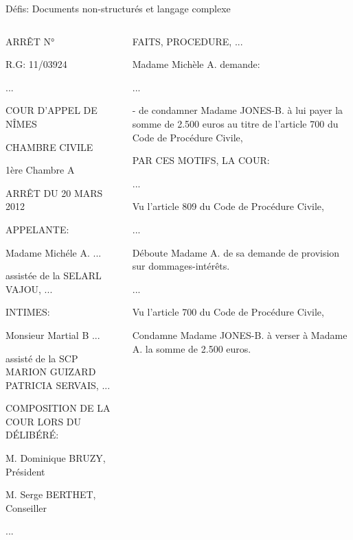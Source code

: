 \documentclass[newPxFont,pagenumber]{beamer}
\begin{document}
\begin{frame}{Défis: Documents non-structurés et langage complexe}
\scriptsize
\begin{columns}
\begin{column}{.50\linewidth}
ARRÊT N°

R.G: 11/03924

...

{COUR D'APPEL} DE {NÎMES}

{CHAMBRE CIVILE}

{1ère Chambre A}

ARRÊT DU {20 MARS 2012}

APPELANTE:

{Madame Michéle A.} ...

assistée de la {SELARL VAJOU}, ...

INTIMES:

{Monsieur Martial B} ...

assisté de la {SCP MARION GUIZARD PATRICIA SERVAIS}, ...

COMPOSITION DE LA COUR LORS DU DÉLIBÉRÉ:

{M. Dominique BRUZY, Président}

{M. Serge BERTHET, Conseiller}

...
\end{column}
\begin{column}{.50\linewidth}
FAITS, PROCEDURE, ...

Madame Michèle A. demande:

...

- de condamner Madame JONES-B. à lui payer la somme de {2.500 euros} au titre de l'{article 700 du Code de Procédure Civile}, 

\vspace{0.4cm}

PAR CES MOTIFS, LA COUR:

...

Vu l'{article 809 du Code de Procédure Civile},

...

{Déboute Madame A. de sa demande de provision sur dommages-intérêts.}

...

Vu l'{article 700 du Code de Procédure Civile},

Condamne Madame JONES-B. à verser à Madame A. la somme de {2.500 euros}.
\end{column}
\end{columns}
\end{frame}
\end{document}
